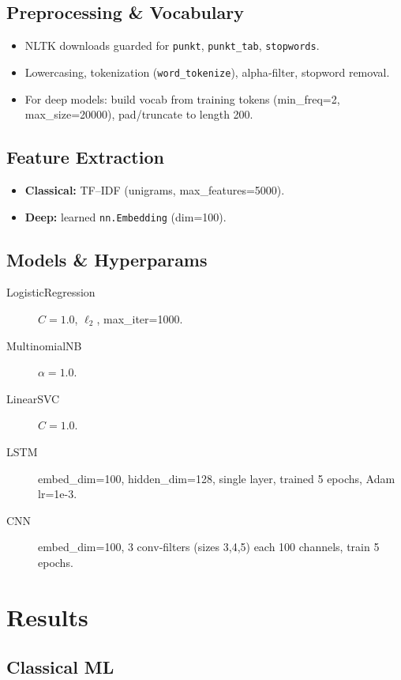 \documentclass[12pt,a4paper]{article}
\begin{document}
\subsection{Preprocessing \& Vocabulary}
\begin{itemize}
  \item NLTK downloads guarded for \texttt{punkt}, \texttt{punkt\_tab}, \texttt{stopwords}.
  \item Lowercasing, tokenization (\texttt{word\_tokenize}), alpha‐filter, stopword removal.
  \item For deep models: build vocab from training tokens (min\_freq=2, max\_size=20000), pad/truncate to length 200.
\end{itemize}

\subsection{Feature Extraction}
\begin{itemize}
  \item \textbf{Classical:} TF–IDF (unigrams, max\_features=5000).
  \item \textbf{Deep:} learned \texttt{nn.Embedding} (dim=100).
\end{itemize}

\subsection{Models \& Hyperparams}
\begin{description}
  \item[LogisticRegression] $C=1.0$, $\ell_2$, max\_iter=1000.
  \item[MultinomialNB] $\alpha=1.0$.
  \item[LinearSVC] $C=1.0$.
  \item[LSTM] embed\_dim=100, hidden\_dim=128, single layer, trained 5 epochs, Adam lr=1e-3.
  \item[CNN] embed\_dim=100, 3 conv‐filters (sizes 3,4,5) each 100 channels, train 5 epochs.
\end{description}

\section{Results}

\subsection{Classical ML}
\end{document}

